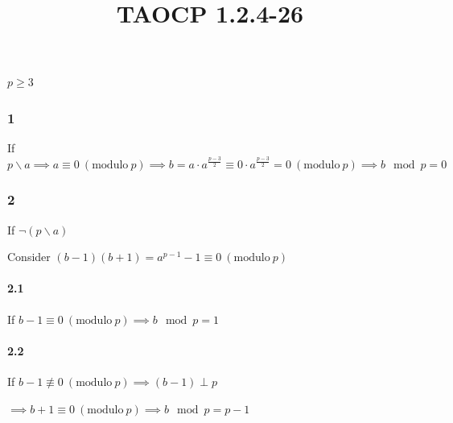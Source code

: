 \documentclass{article}
\title{TAOCP 1.2.4\mbox{-}26}
\begin{document}
\maketitle

\( p \geq 3 \)

\subsubsection*{1}

If \( p \backslash a \implies a \equiv 0\ (\mathrm{modulo}\ p) \implies b = a \cdot a^{\frac{p-3}{2}} \equiv 0 \cdot a^{\frac{p-3}{2}} = 0 \ (\mathrm{modulo}\ p) \implies b \mod p = 0 \)

\subsubsection*{2}

If \( \lnot(p \backslash a) \)

Consider \( (b-1)(b+1)=a^{p-1}-1 \equiv 0\ (\mathrm{modulo}\ p) \)

\paragraph*{2.1}

If \( b - 1 \equiv 0\ (\mathrm{modulo}\ p) \implies b \mod p = 1 \)

\paragraph*{2.2}

If \( b - 1 \not\equiv 0\ (\mathrm{modulo}\ p) \implies (b - 1) \perp p \)

\( \implies b + 1 \equiv 0\ (\mathrm{modulo}\ p) \implies b \mod p = p - 1 \)
\end{document}
